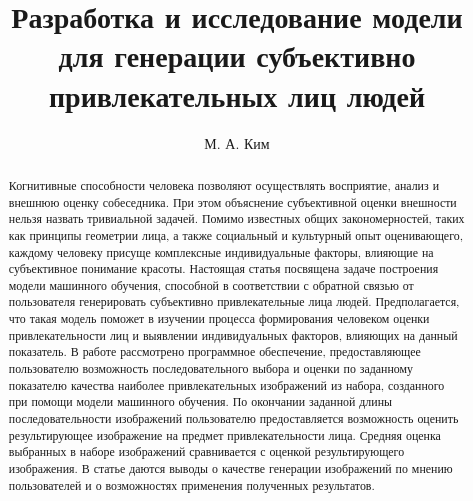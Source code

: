 \documentclass[60x84/16,8pt]{ittmm}
\begin{document}

\title{Разработка и исследование модели для генерации субъективно привлекательных лиц людей}

\author[1]{М. А. Ким}

\address[1]{Кафедра математического моделирования и искусственного интеллекта,\\
  Российский университет дружбы народов,\\
  ул. Миклухо-Маклая, д.6, Москва, Россия, 117198}


\begin{abstract}
Когнитивные способности человека позволяют осуществлять восприятие, анализ и внешнюю оценку собеседника.
При этом объяснение субъективной оценки внешности нельзя назвать тривиальной задачей.
Помимо известных общих закономерностей, таких как принципы геометрии лица, а также социальный и культурный опыт оценивающего,
каждому человеку присуще комплексные индивидуальные факторы, влияющие на субъективное понимание красоты.
Настоящая статья посвящена задаче построения модели машинного обучения, способной в соответствии с обратной связью
от пользователя генерировать субъективно привлекательные лица людей.
Предполагается, что такая модель поможет в изучении процесса формирования человеком оценки привлекательности лиц
и выявлении индивидуальных факторов, влияющих на данный показатель. В работе рассмотрено программное обеспечение,
предоставляющее пользователю возможность последовательного выбора и оценки по заданному показателю качества наиболее
привлекательных изображений из набора, созданного при помощи модели машинного обучения.
По окончании заданной длины последовательности изображений пользователю предоставляется возможность
оценить результирующее изображение на предмет привлекательности лица.
Средняя оценка выбранных в наборе изображений сравнивается с оценкой результирующего изображения.
В статье даются выводы о качестве генерации изображений по мнению пользователей и о возможностях применения полученных результатов.
\end{abstract}


\end{document}
